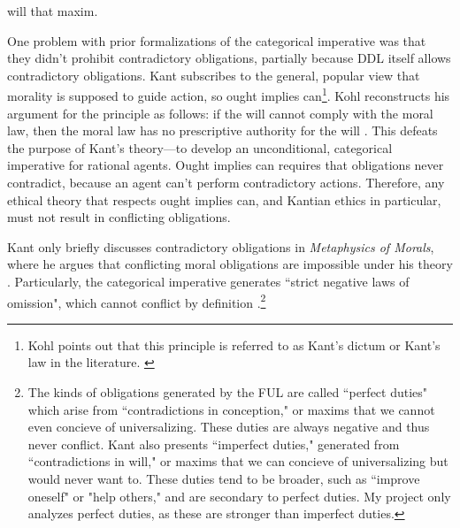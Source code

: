 \begin{isabellebody}
{will that maxim.%
}%
\begin{isamarkuptext}%
One problem with prior formalizations of the categorical imperative was that they didn't
prohibit contradictory obligations, partially because DDL itself allows contradictory obligations. 
Kant subscribes to the general, popular view that morality is supposed to guide action, so ought implies 
can\footnote{Kohl points out that this principle is referred to as 
Kant's dictum or Kant's law in the literature. \cite[footnote 1]{kohl}}. Kohl reconstructs his argument for the principle as 
follows: if the will cannot comply with the moral law, then the moral law has no prescriptive authority 
for the will \cite[703-4]{kohl}. This defeats the purpose of Kant's theory—to develop an unconditional, categorical imperative 
for rational agents. Ought implies can requires that obligations never contradict, because an agent 
can't perform contradictory actions. Therefore, any ethical theory that respects ought implies can, 
and Kantian ethics in particular, must not result in conflicting obligations.

Kant only briefly discusses contradictory obligations in \emph{Metaphysics of Morals}, where he argues that 
conflicting moral obligations are impossible under his theory \cite[V224]{metaphysicsintro}. Particularly, the categorical imperative generates 
``strict negative laws of omission", which cannot conflict by definition \cite[45]{timmerman}.\footnote{The 
kinds of obligations generated by the FUL are called ``perfect duties" which arise from ``contradictions 
in conception," or maxims that we cannot even concieve of universalizing. These duties are always negative 
and thus never conflict. Kant also presents ``imperfect duties," generated from ``contradictions in will,"
or maxims that we can concieve of universalizing but would never want to. These duties tend to be broader, 
such as ``improve oneself" or "help others," and are secondary to perfect duties. My project only analyzes 
perfect duties, as these are stronger than imperfect duties.} 


\end{isamarkuptext}
\end{isabellebody}
